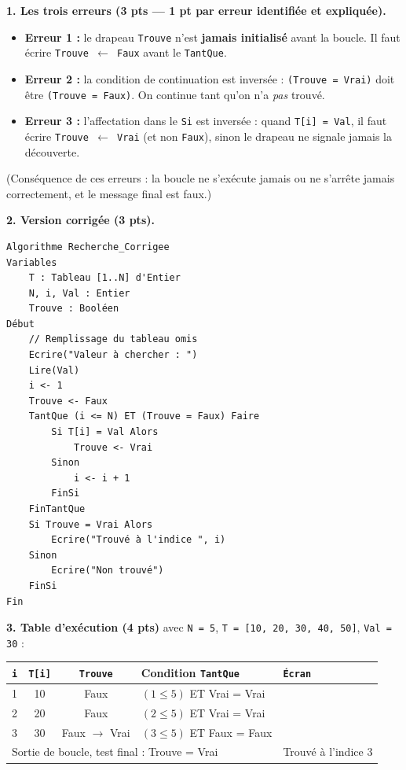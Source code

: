 \documentclass[11pt]{article}
\begin{document}
\begin{corrige}
\textbf{1. Les trois erreurs (3 pts — 1 pt par erreur identifiée et expliquée).}
\begin{itemize}
    \item \textbf{Erreur 1 :} le drapeau \texttt{Trouve} n'est \textbf{jamais initialisé} avant la boucle. Il faut écrire \texttt{Trouve $\leftarrow$ Faux} avant le \texttt{TantQue}.
    \item \textbf{Erreur 2 :} la condition de continuation est inversée : \texttt{(Trouve = Vrai)} doit être \texttt{(Trouve = Faux)}. On continue tant qu'on n'a \emph{pas} trouvé.
    \item \textbf{Erreur 3 :} l'affectation dans le \texttt{Si} est inversée : quand \texttt{T[i] = Val}, il faut écrire \texttt{Trouve $\leftarrow$ Vrai} (et non \texttt{Faux}), sinon le drapeau ne signale jamais la découverte.
\end{itemize}
(Conséquence de ces erreurs : la boucle ne s'exécute jamais ou ne s'arrête jamais correctement, et le message final est faux.)

\textbf{2. Version corrigée (3 pts).}
\begin{lstlisting}
Algorithme Recherche_Corrigee
Variables
    T : Tableau [1..N] d'Entier
    N, i, Val : Entier
    Trouve : Booléen
Début
    // Remplissage du tableau omis
    Ecrire("Valeur à chercher : ")
    Lire(Val)
    i <- 1
    Trouve <- Faux
    TantQue (i <= N) ET (Trouve = Faux) Faire
        Si T[i] = Val Alors
            Trouve <- Vrai
        Sinon
            i <- i + 1
        FinSi
    FinTantQue
    Si Trouve = Vrai Alors
        Ecrire("Trouvé à l'indice ", i)
    Sinon
        Ecrire("Non trouvé")
    FinSi
Fin
\end{lstlisting}

\textbf{3. Table d'exécution (4 pts)} avec \texttt{N = 5}, \texttt{T = [10, 20, 30, 40, 50]}, \texttt{Val = 30} :

\begin{center}
\begin{tabularx}{\linewidth}{|c|c|c|l|X|}
\hline
\rowcolor{popblueL}
\texttt{i} & \texttt{T[i]} & \texttt{Trouve} & Condition \texttt{TantQue} & \texttt{Écran} \\
\hline
1 & 10 & Faux & $(1 \le 5)$ ET Vrai = Vrai & \\
\hline
2 & 20 & Faux & $(2 \le 5)$ ET Vrai = Vrai & \\
\hline
3 & 30 & Faux $\rightarrow$ Vrai & $(3 \le 5)$ ET Faux = Faux & \\
\hline
\multicolumn{4}{|l|}{Sortie de boucle, test final : Trouve = Vrai} & Trouvé à l'indice 3 \\
\hline
\end{tabularx}
\end{center}


\end{corrige}
\end{document}
